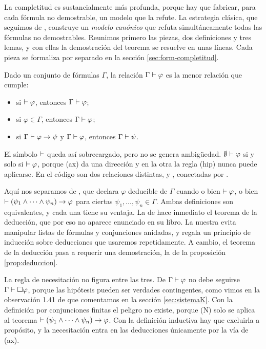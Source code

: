 La completitud es sustancialmente más profunda, porque hay que fabricar, para cada fórmula no demostrable, un modelo que la refute. La estrategia clásica, que seguimos de \cite{blackburn}, construye un \emph{modelo canónico} que refuta simultáneamente todas las fórmulas no demostrables. Reunimos primero las piezas, dos definiciones y tres lemas, y con ellas la demostración del teorema se resuelve en unas líneas. Cada pieza se formaliza por separado en la sección \ref{sec:form-completitud}.

\begin{definicion}\label{def:deducible}
Dado un conjunto de fórmulas $\Gamma$, la relación $\Gamma \vdash \varphi$ es la menor relación que cumple:
\begin{itemize}
  \item[\textup{(ax)}] si $\vdash \varphi$, entonces $\Gamma \vdash \varphi$;
  \item[\textup{(hip)}] si $\varphi \in \Gamma$, entonces $\Gamma \vdash \varphi$;
  \item[\textup{(MP)}] si $\Gamma \vdash \varphi \to \psi$ y $\Gamma \vdash \varphi$, entonces $\Gamma \vdash \psi$.
\end{itemize}
\end{definicion}

El símbolo $\vdash$ queda así sobrecargado, pero no se genera ambigüedad. $\emptyset \vdash \varphi$ si y solo si $\vdash \varphi$, porque (ax) da una dirección y en la otra la regla (hip) nunca puede aplicarse. En el código son dos relaciones distintas,  y , conectadas por .

Aquí nos separamos de \cite[Def.~4.4]{blackburn}, que declara $\varphi$ deducible de $\Gamma$ cuando o bien $\vdash \varphi$, o bien $\vdash (\psi_1 \land \dots \land \psi_n) \to \varphi$ para ciertas $\psi_1, \dots, \psi_n \in \Gamma$. Ambas definiciones son equivalentes, y cada una tiene su ventaja. La de \cite{blackburn} hace inmediato el teorema de la deducción, que por eso no aparece enunciado en su libro. La nuestra evita manipular listas de fórmulas y conjunciones anidadas, y regala un principio de inducción sobre deducciones que usaremos repetidamente. A cambio, el teorema de la deducción pasa a requerir una demostración, la de la proposición \ref{prop:deduccion}.

\begin{observacion}\label{obs:sin-necesitacion}
La regla de necesitación no figura entre las tres. De $\Gamma \vdash \varphi$ no debe seguirse $\Gamma \vdash \square\varphi$, porque las hipótesis pueden ser verdades contingentes, como vimos en la observación 1.41 de \cite{blackburn} que comentamos en la sección \ref{sec:sistemaK}. Con la definición por conjunciones finitas el peligro no existe, porque (N) solo se aplica al teorema $\vdash (\psi_1 \land \dots \land \psi_n) \to \varphi$. Con la definición inductiva hay que excluirla a propósito, y la necesitación entra en las deducciones únicamente por la vía de (ax).
\end{observacion}

